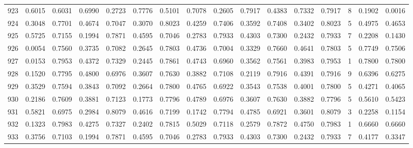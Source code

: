 \begin{tabular}{lrrrrrrrrrrrrrrr}
923 &      0.6015 &  0.6031 &  0.6990 &  0.2723 &  0.7776 &  0.5101 &  0.7078 &  0.2605 &  0.7917 &  0.4383 &   0.7332 &     0.7917 &      8 &                    0.1902 &                     0.0016 \\
924 &      0.3048 &  0.7701 &  0.4674 &  0.7047 &  0.3070 &  0.8023 &  0.4259 &  0.7406 &  0.3592 &  0.7408 &   0.3402 &     0.8023 &      5 &                    0.4975 &                     0.4653 \\
925 &      0.5725 &  0.7155 &  0.1994 &  0.7871 &  0.4595 &  0.7046 &  0.2783 &  0.7933 &  0.4303 &  0.7300 &   0.2432 &     0.7933 &      7 &                    0.2208 &                     0.1430 \\
926 &      0.0054 &  0.7560 &  0.3735 &  0.7082 &  0.2645 &  0.7803 &  0.4736 &  0.7004 &  0.3329 &  0.7660 &   0.4641 &     0.7803 &      5 &                    0.7749 &                     0.7506 \\
927 &      0.0153 &  0.7953 &  0.4372 &  0.7329 &  0.2445 &  0.7861 &  0.4743 &  0.6960 &  0.3562 &  0.7561 &   0.3983 &     0.7953 &      1 &                    0.7800 &                     0.7800 \\
928 &      0.1520 &  0.7795 &  0.4800 &  0.6976 &  0.3607 &  0.7630 &  0.3882 &  0.7108 &  0.2119 &  0.7916 &   0.4391 &     0.7916 &      9 &                    0.6396 &                     0.6275 \\
929 &      0.3529 &  0.7594 &  0.3843 &  0.7092 &  0.2664 &  0.7800 &  0.4765 &  0.6922 &  0.3543 &  0.7538 &   0.4001 &     0.7800 &      5 &                    0.4271 &                     0.4065 \\
930 &      0.2186 &  0.7609 &  0.3881 &  0.7123 &  0.1773 &  0.7796 &  0.4789 &  0.6976 &  0.3607 &  0.7630 &   0.3882 &     0.7796 &      5 &                    0.5610 &                     0.5423 \\
931 &      0.5821 &  0.6975 &  0.2984 &  0.8079 &  0.4616 &  0.7199 &  0.1742 &  0.7794 &  0.4785 &  0.6921 &   0.3601 &     0.8079 &      3 &                    0.2258 &                     0.1154 \\
932 &      0.1323 &  0.7983 &  0.4275 &  0.7327 &  0.2402 &  0.7815 &  0.5029 &  0.7118 &  0.2579 &  0.7872 &   0.4750 &     0.7983 &      1 &                    0.6660 &                     0.6660 \\
933 &      0.3756 &  0.7103 &  0.1994 &  0.7871 &  0.4595 &  0.7046 &  0.2783 &  0.7933 &  0.4303 &  0.7300 &   0.2432 &     0.7933 &      7 &                    0.4177 &                     0.3347 \\

\end{tabular}
